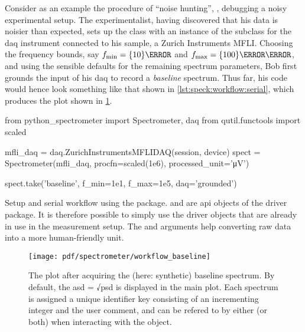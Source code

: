 Consider as an example the procedure of \enquote{noise hunting}, \ie, debugging a noisy experimental setup.
The experimentalist,
having discovered that his data is noisier than expected, sets up the  class with an instance of the  subclass for the \gls{daq} instrument connected to his sample, a Zurich Instruments MFLI.
Choosing the frequency bounds, say $\fmin = \qty{10}{\hertz}$ and $\fmax = \qty{100}{\kilo\hertz}$, and using the sensible defaults for the remaining spectrum parameters, Bob first grounds the input of his \gls{daq} to record a \emph{baseline} spectrum.
Thus far, his code would hence look something like that shown in \cref{lst:speck:workflow:serial}, which produces the plot shown in \cref{fig:speck:software:workflow:baseline}.

\begin{listing}[htpb]
    \begin{py}
        from python_spectrometer import Spectrometer, daq
        from qutil.functools import scaled

        mfli_daq = daq.ZurichInstrumentsMFLIDAQ(session, device)
        spect = Spectrometer(mfli_daq, procfn=scaled(1e6),
                             processed_unit='μV')

        spect.take('baseline', f_min=1e1, f_max=1e5, daq='grounded')
    \end{py}
    \caption[\pyspeck serial workflow]{
        Setup and serial workflow using the \pyspeck package.
         and  are \gls{api} objects of the  driver package.
        It is therefore possible to simply use the driver objects that are already in use in the measurement setup.
        The  and  arguments help converting raw data into a more human-friendly unit.
    }
    \label{lst:speck:workflow:serial}
\end{listing}
\begin{figure}
    \centering
    \texttt{[image: pdf/spectrometer/workflow\_baseline]}
    \caption{
        The \pyspeck plot after acquiring the (here: synthetic) baseline spectrum.
        By default, the \gls{asd} = √\gls{psd} is displayed in the main plot.
        Each spectrum is assigned a unique identifier key consisting of an incrementing integer and the user comment, and can be refered to by either (or both) when interacting with the object.
    }
    \label{fig:speck:software:workflow:baseline}
\end{figure}

